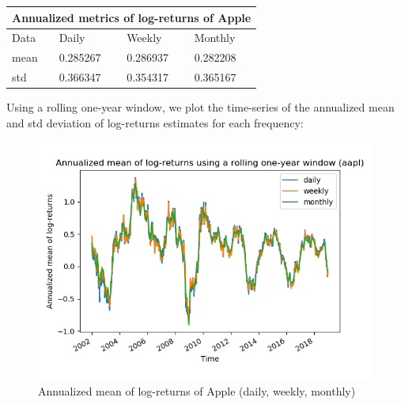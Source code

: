 \documentclass[10pt]{article}
\newenvironment{exercise}[2][Exercise]{\begin{trivlist}
  \item[\hskip \labelsep {\bfseries #1}\hskip \labelsep {\bfseries #2.}]}{\end{trivlist}}
\begin{document}
\begin{exercise}{4}
	\begin{tabular}{ |p{3cm}||p{3cm}|p{3cm}|p{3cm}|  }
		\hline
	 	\multicolumn{4}{|c|}{Annualized metrics of log-returns of Apple} \\
	 	\hline
	 	Data & Daily & Weekly & Monthly\\
 		\hline
 		mean  &  0.285267 & 0.286937 & 0.282208\\
 		std & 0.366347 & 0.354317 & 0.365167\\
 		\hline
	\end{tabular}
	
	\bigbreak	
	
	Using a rolling one-year window, we plot the time-series of the annualized mean and std deviation of log-returns estimates for each frequency:
	
	\begin{figure}[H]
	
		\centering
		\includegraphics[scale=0.5]{Figures/problem4d_mean_aapl.png}	
		\caption{Annualized mean of log-returns of Apple (daily, weekly, monthly)}	
		\label{fig:problem3d_mean_aapl}
	
	\end{figure}
	
	\begin{figure}[H]
	

\end{figure}
\end{exercise}
\end{document}
